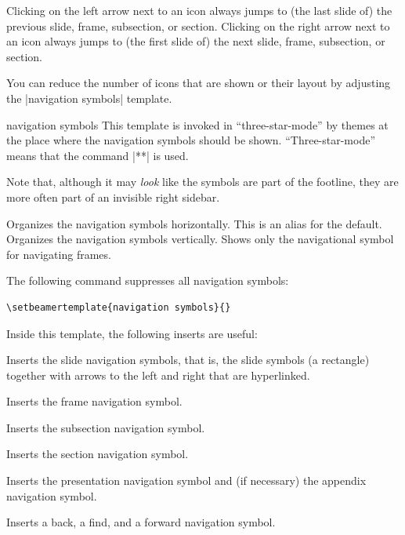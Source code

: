 \endgroup
Clicking on the left arrow next to an icon always jumps to (the last slide of) the previous slide, frame, subsection, or section. Clicking on the right arrow next to an icon always jumps to (the first slide of) the next slide, frame, subsection, or section.

You can reduce the number of icons that are shown or their layout by adjusting the |navigation symbols| template.

\begin{element}{navigation symbols}\yes\yes\yes
  This template is invoked in ``three-star-mode'' by themes at the place where the navigation symbols should be shown. ``Three-star-mode'' means that the command |\usebeamertemplate***| is used.

  Note that, although it may \emph{look} like the symbols are part of the footline, they are more often part of an invisible right sidebar.

  \begin{templateoptions}
    Organizes the navigation symbols horizontally.
    This is an alias for the default.
    Organizes the navigation symbols vertically.
    Shows only the navigational symbol for navigating frames.
  \end{templateoptions}

  \example
  The following command suppresses all navigation symbols:
\begin{verbatim}
\setbeamertemplate{navigation symbols}{}
\end{verbatim}

  Inside this template, the following inserts are useful:
  \begin{itemize}
    \iteminsert{\insertslidenavigationsymbol}
    Inserts the slide navigation symbols, that is, the slide symbols (a rectangle) together with arrows to the left and right that are hyperlinked.

    \iteminsert{\insertframenavigationsymbol}
    Inserts the frame navigation symbol.

    \iteminsert{\insertsubsectionnavigationsymbol}
    Inserts the subsection navigation symbol.

    \iteminsert{\insertsectionnavigationsymbol}
    Inserts the section navigation symbol.

    \iteminsert{\insertdocnavigationsymbol}
    Inserts the presentation navigation symbol and (if necessary) the appendix navigation symbol.

    \iteminsert{\insertbackfindforwardnavigationsymbol}
    Inserts a back, a find, and a forward navigation symbol.
  \end{itemize}
\end{element}

